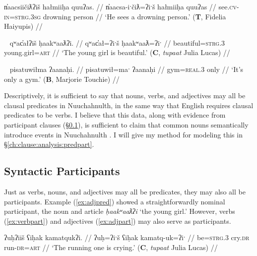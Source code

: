 \begin{comment}
While all three words have semantic relations (\textsc{see}, \textsc{drown}, \textsc{person}), only one is the syntactic predicate of the sentence.	
\end{comment}

\ex \label{ex:verbpred}
\begingl
\glpreamble n̓aacsiičiƛʔiš hałmiiḥa quuʔas. //
\gla n̓aacsa-iˑčiƛ=ʔiˑš hałmiiḥa quuʔas //
\glb see.\textsc{cv}-\textsc{in}=\textsc{strg.3sg} drowning person //
\glft `He sees a drowning person.' (\textbf{T}, Fidelia Haiyupis) //
\endgl
\xe

\ex~ \label{ex:adjpred}
\begingl
\glpreamble qʷac̓ałʔiš ḥaakʷaaƛʔi. //
\gla qʷac̓ał=ʔiˑš ḥaakʷaaƛ=ʔiˑ //
\glb beautiful=\textsc{strg.3} young.girl=\textsc{art} //
\glft `The young girl is beautiful.' (\textbf{C}, \textit{tupaat} Julia Lucas) //
\endgl
\xe

\ex~ \label{ex:nounpred}
\begingl
\glpreamble pisatuwiłma ʔaanaḥi. //
\gla pisatuwił=maˑ ʔaanaḥi //
\glb gym=\textsc{real.3} only //
\glft `It's only a gym.' (\textbf{B}, Marjorie Touchie) //
\endgl
\xe

Descriptively, it is sufficient to say that nouns, verbs, and adjectives may all be clausal predicates in Nuuchahnulth, in the same way that English requires clausal predicates to be verbs. I believe that this data, along with evidence from participant clauses (\S\ref{ch:clause:partp}), is sufficient to claim that common nouns semantically introduce events in Nuuchahnulth \citep{inman2018}. I will give my method for modeling this in \S\ref{ch:clause:analysis:predpart}.

\subsection{Syntactic Participants} \label{ch:clause:partp}

Just as verbs, nouns, and adjectives may all be predicates, they may also all be participants. Example (\ref{ex:adjpred}) showed a straightforwardly nominal participant, the noun and article \textit{ḥaakʷaaƛʔi} `the young girl.' However, verbs (\ref{ex:verbpart}) and adjectives (\ref{ex:adjpart}) may also serve as participants.

\ex \label{ex:verbpart}
\begingl
\glpreamble ʔuḥʔiiš ʕiḥak kamatqukʔi. //
\gla ʔuḥ=ʔiˑš ʕiḥak kamatq-uk=ʔiˑ //
\glb be=\textsc{strg.3} cry.\textsc{dr} run-\textsc{dr}=\textsc{art} //
\glft `The running one is crying.' (\textbf{C}, \textit{tupaat} Julia Lucas) //
\endgl
\xe

